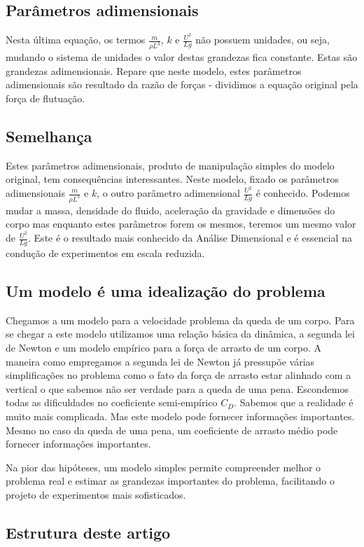 \documentclass[article,12pt,oneside,a4paper,english,brazil,sumario=tradicional]{abntex2}
\begin{document}
\subsection{Parâmetros adimensionais}
Nesta última equação, os termos $\frac{m}{\rho L^3}$, $k$ e $\frac{U^2}{L g}$ não possuem unidades, ou seja, mudando o sistema de unidades o valor destas grandezas fica constante. Estas são grandezas adimensionais. Repare que neste modelo, estes parâmetros adimensionais são resultado da razão de forças - dividimos a equação original pela força de flutuação.

\subsection{Semelhança}
Estes parâmetros adimensionais, produto de manipulação simples do modelo original, tem consequências interessantes. Neste modelo, fixado os parâmetros adimensionais $\frac{m}{\rho L^3}$ e $k$, o outro parâmetro adimensional $\frac{U^2}{Lg}$ é conhecido. Podemos mudar a massa, densidade do fluido, aceleração da gravidade e dimensões do corpo mas enquanto estes parâmetros forem os mesmos, teremos um mesmo valor de $\frac{U^2}{Lg}$. Este é o resultado mais conhecido da Análise Dimensional e é essencial na condução de experimentos em escala reduzida.

\subsection{Um modelo é uma idealização do problema}
Chegamos a um modelo para a velocidade  problema da queda de um corpo. Para se chegar a este modelo utilizamos uma relação básica da dinâmica, a segunda lei de Newton e um modelo empírico para a força de arrasto de um corpo. A maneira como empregamos a segunda lei de Newton já pressupõe várias simplificações no problema como o fato da força de arrasto estar alinhado com a vertical o que sabemos não ser verdade para a queda de uma pena. Escondemos todas as dificuldades no coeficiente semi-empírico $C_D$. Sabemos que a realidade é muito mais complicada. Mas este modelo pode fornecer informações importantes. Mesmo no caso da queda de uma pena, um coeficiente de arrasto médio pode fornecer informações importantes.

Na pior das hipóteses, um modelo simples permite compreender melhor o problema real e estimar as grandezas importantes do problema, facilitando o projeto de experimentos mais sofisticados.

\subsection{Estrutura deste artigo}
\end{document}

